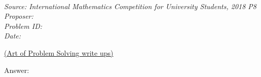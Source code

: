 \SSbreak\\       
\emph{Source: International Mathematics Competition for University Students, 2018 P8}\\
\emph{Proposer: \Pss}\\
\emph{Problem ID:}\\
\emph{Date: }\\
\SSbreak

\bigskip

\begin{solution}\hfil\medskip

    \href{https://artofproblemsolving.com/community/c7h1679688p10705994}{(Art of Problem Solving write ups)}\medskip
    
    Answer: 
\end{solution}
